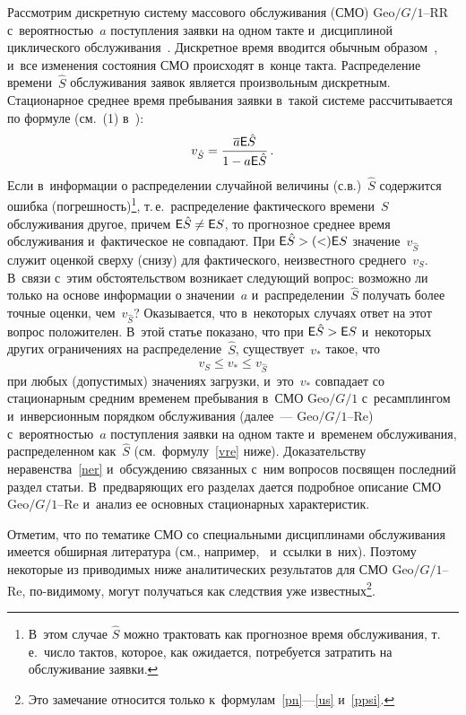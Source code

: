 \begin{multicols}{2}
Рассмотрим дискретную систему массового обслуживания (СМО) $\mathrm{Geo}/G/1$--RR
с~вероятностью~$a$ поступления заявки на одном такте и~дисциплиной циклического
 обслуживания~\cite{Schass2}.
Дискретное время вводится обычным образом~\cite{distime},
и~все изменения состояния СМО происходят в~конце такта.
Распределение времени~$\hat{S}$ обслуживания заявок является
произвольным дискретным. Стационарное среднее время пребывания
заявки в~такой системе рассчитывается по формуле (см.~(1) в~\cite{Schass}):
\begin{equation}
\label{shassb}
v_{\hat S}= \displaystyle\frac{\displaystyle \overline{a} \mathsf{E}{\hat S}\mathstrut}{\displaystyle 1- a  \mathsf{E}{\hat S}\mathstrut}\,.
\end{equation}
Если в~информации о распределении случайной величины (с.в.)~$\hat{S}$
содержится ошибка (погрешность)\footnote[3]{В~этом случае $\hat{S}$
можно трактовать как прогнозное время
обслуживания, т.\,е.\ число тактов, которое, как ожидается,
потребуется затратить на обслуживание заявки.}, т.\,е.\
распределение фактического времени~$S$ обслуживания
другое, причем $\mathsf{E}{\hat S}\hm\neq \mathsf{E}{S}$,
то прогнозное среднее время обслуживания и~фактическое не совпадают.
При $\mathsf{E}{\hat S}\hm>(<)\mathsf{E}{S}$ значение~$v_{\hat S}$
служит оценкой сверху (снизу) для фактического, неизвестного среднего~$v_{S}$.
В~связи с~этим обстоятельством возникает следующий вопрос:
возможно ли только на основе информации о значении~$a$
и~распределении~$\hat{S}$ получать более точные оценки, чем~$v_{\hat S}$?
Оказывается, что в~некоторых случаях ответ на этот вопрос
положителен. В~этой статье показано,
что при $\mathsf{E}{\hat S}\hm>\mathsf{E}{S}$ и~некоторых
других ограничениях на распределение~$\hat{S}$, существует~$v_*$ такое, что
\begin{equation}
\label{ner}
v_{S} \le v_* \le v_{\hat S}
\end{equation}
при любых (допустимых) значениях загрузки, и~это~$v_*$
совпадает со стационарным средним временем пребывания в~СМО
$\mathrm{Geo}/G/1$ с~ресамплингом и~инверсионным порядком обслуживания (далее~--- 
$\mathrm{Geo}/G/1$--Re)
с~вероятностью~$a$ поступления заявки на одном такте
и~временем обслуживания, распределенном как~${\hat S}$ (см.\ формулу~\eqref{vre} ниже).
Доказательству неравенства~\eqref{ner} и~обсуждению
связанных с~ним вопросов посвящен последний раздел статьи.
В~предваряющих его разделах дается подробное описание СМО $\mathrm{Geo}/G/1$--Re
и~анализ ее основных стационарных характеристик.

Отметим, что по тематике СМО со специальными дисциплинами обслуживания
имеется обширная литература (см., 
например,~\cite{n0,n5,nm1,new1,wfb,new2,new3,new4,new5,stal,mey}
и~ссылки в~них).
Поэтому некоторые из приводимых ниже аналитических результатов для СМО $\mathrm{Geo}/G/1$--Re,
по-ви\-ди\-мо\-му, могут получаться как следствия уже известных\footnote[1]{Это замечание относится только к~формулам~\eqref{pn}---\eqref{us} и~\eqref{ppsi}.}.


\end{multicols}
